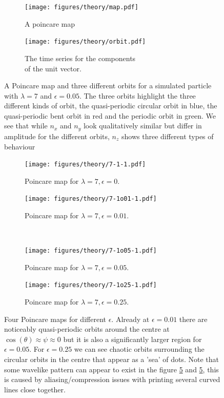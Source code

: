 \begin{figure}[H]
\centering
\begin{subfigure}[b]{0.45\textwidth}
\texttt{[image: figures/theory/map.pdf]}
\caption{A poincare map}\label{fig:orbitmap}
\end{subfigure}\hspace{1em}%
\begin{subfigure}[b]{0.5\textwidth}
\texttt{[image: figures/theory/orbit.pdf]}
\caption{The time series for the components \\ of the unit vector.}\label{fig:orbitparams}
\end{subfigure}
\caption{A Poincare map and three different orbits for a simulated particle with $\lambda=7$ and $\epsilon=0.05$. The three orbits highlight the three different kinds of orbit, the quasi-periodic circular orbit in blue, the quasi-periodic bent orbit in red and the periodic orbit in green. We see that while $n_x$ and $n_y$ look qualitatively similar but differ in amplitude for the different orbits, $n_z$ shows three different types of behaviour}
\label{fig:orbittypes}
\end{figure}



\begin{figure}[H]
\centering
\begin{subfigure}[3a]{0.40\textwidth}
\texttt{[image: figures/theory/7-1-1.pdf]}
\caption{Poincare map for $\lambda = 7, \epsilon = 0$.}\label{fig:orbitmap1}
\end{subfigure}\hspace{1em}%
\begin{subfigure}[3b]{0.40\textwidth}
\texttt{[image: figures/theory/7-1o01-1.pdf]}
\caption{Poincare map for $\lambda = 7, \epsilon = 0.01$.}\label{fig:orbitmap2}
\end{subfigure} \\
\begin{subfigure}[3a]{0.40\textwidth}
\texttt{[image: figures/theory/7-1o05-1.pdf]}
\caption{Poincare map for $\lambda = 7, \epsilon = 0.05$.}\label{fig:orbitmap3}
\end{subfigure}\hspace{1em}%
	\begin{subfigure}[3b]{0.40\textwidth}
\texttt{[image: figures/theory/7-1o25-1.pdf]}
\caption{Poincare map for $\lambda = 7, \epsilon = 0.25$.}\label{fig:orbitmap4}
\end{subfigure} 
\caption{Four Poincare maps for different $\epsilon$. Already at $\epsilon = 0.01$ there are noticeably quasi-periodic 
orbits around the centre at $\cos(\theta) \approx \psi \approx 0$ but it is also a significantly larger region for $\epsilon = 0.05$. For $\epsilon = 0.25$ we can see chaotic orbits surrounding the circular orbits in the centre that appear as a 'sea' of dots. Note that some wavelike pattern can appear to exist in the figure \ref{fig:orbitmap2} and  \ref{fig:orbitmap2}, this is caused by aliasing/compression issues with printing several curved lines close together.}\label{fig:orbitmaps}
\end{figure}

